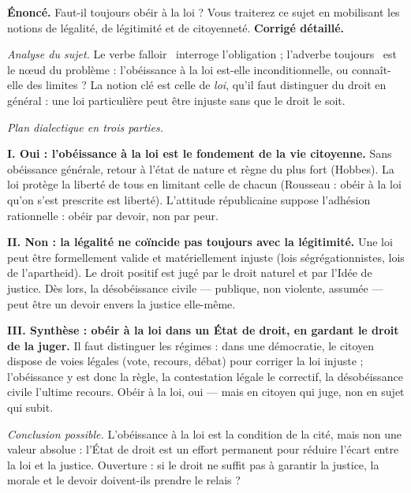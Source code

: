 \documentclass[11pt]{article}
\begin{document}
\begin{exoresolu}
\textbf{Énoncé.} Faut-il toujours obéir à la loi ? Vous traiterez ce sujet en mobilisant les notions de légalité, de légitimité et de citoyenneté.
\tcblower
\textbf{Corrigé détaillé.}

\emph{Analyse du sujet.} Le verbe \guillemotleft falloir \guillemotright\ interroge l'obligation ; l'adverbe \guillemotleft toujours \guillemotright\ est le nœud du problème : l'obéissance à la loi est-elle inconditionnelle, ou connaît-elle des limites ? La notion clé est celle de \emph{loi}, qu'il faut distinguer du droit en général : une loi particulière peut être injuste sans que le droit le soit.

\emph{Plan dialectique en trois parties.}

\textbf{I. Oui : l'obéissance à la loi est le fondement de la vie citoyenne.} Sans obéissance générale, retour à l'état de nature et règne du plus fort (Hobbes). La loi protège la liberté de tous en limitant celle de chacun (Rousseau : obéir à la loi qu'on s'est prescrite est liberté). L'attitude républicaine suppose l'adhésion rationnelle : obéir par devoir, non par peur.

\textbf{II. Non : la légalité ne coïncide pas toujours avec la légitimité.} Une loi peut être formellement valide et matériellement injuste (lois ségrégationnistes, lois de l'apartheid). Le droit positif est jugé par le droit naturel et par l'Idée de justice. Dès lors, la désobéissance civile — publique, non violente, assumée — peut être un devoir envers la justice elle-même.

\textbf{III. Synthèse : obéir à la loi dans un État de droit, en gardant le droit de la juger.} Il faut distinguer les régimes : dans une démocratie, le citoyen dispose de voies légales (vote, recours, débat) pour corriger la loi injuste ; l'obéissance y est donc la règle, la contestation légale le correctif, la désobéissance civile l'ultime recours. Obéir à la loi, oui — mais en citoyen qui juge, non en sujet qui subit.

\emph{Conclusion possible.} L'obéissance à la loi est la condition de la cité, mais non une valeur absolue : l'État de droit est un effort permanent pour réduire l'écart entre la loi et la justice. Ouverture : si le droit ne suffit pas à garantir la justice, la morale et le devoir doivent-ils prendre le relais ?
\end{exoresolu}
\end{document}
